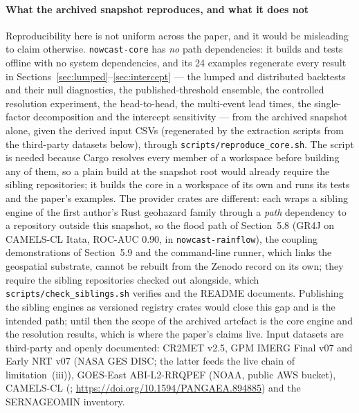 \documentclass[authoryear,preprint,review,12pt]{elsarticle}
\begin{document}
\paragraph{What the archived snapshot reproduces, and what it does not}
Reproducibility here is not uniform across the paper, and it would be misleading to
claim otherwise. \texttt{nowcast-core} has \emph{no} path dependencies: it builds
and tests offline with no system dependencies, and its 24 examples regenerate every
result in Sections~\ref{sec:lumped}--\ref{sec:intercept} --- the lumped and
distributed backtests and their null diagnostics, the published-threshold ensemble,
the controlled resolution experiment, the head-to-head, the multi-event lead times,
the single-factor decomposition and the intercept sensitivity --- from the archived
snapshot alone, given the derived input CSVs (regenerated by the extraction scripts
from the third-party datasets below), through \texttt{scripts/reproduce\_core.sh}.
The script is needed because Cargo resolves every member of a workspace before
building any of them, so a plain build at the snapshot root would already require
the sibling repositories; it builds the core in a workspace of its own and runs its
tests and the paper's examples. The provider crates are different: each wraps
a sibling engine of the first author's Rust geohazard family through a \emph{path}
dependency to a repository outside this snapshot, so the flood path of
Section~5.8 (GR4J on CAMELS-CL Itata, ROC-AUC 0.90, in
\texttt{nowcast-rainflow}), the coupling demonstrations of Section~5.9 and the
command-line runner, which links the geospatial substrate, cannot be rebuilt from
the Zenodo record on its own; they require the sibling repositories checked out
alongside, which \texttt{scripts/check\_siblings.sh} verifies and the README
documents. Publishing the sibling engines as versioned registry crates would close
this gap and is the intended path; until then the scope of the archived artefact is the core engine and the resolution results, which is where the paper's
claims live. Input datasets are third-party and openly documented: CR2MET v2.5,
GPM IMERG Final v07 and Early NRT v07 (NASA GES DISC; the latter feeds the live
chain of limitation~(iii)), GOES-East ABI-L2-RRQPEF (NOAA, public AWS bucket),
CAMELS-CL
(\citealp{alvarez2018}; \url{https://doi.org/10.1594/PANGAEA.894885}) and the
SERNAGEOMIN inventory.
\end{document}
